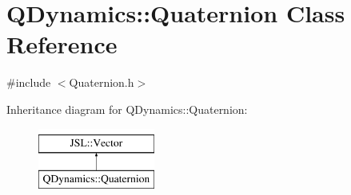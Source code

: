\hypertarget{classQDynamics_1_1Quaternion}{}\section{Q\+Dynamics\+:\+:Quaternion Class Reference}
\label{classQDynamics_1_1Quaternion}


{\ttfamily \#include $<$Quaternion.\+h$>$}

Inheritance diagram for Q\+Dynamics\+:\+:Quaternion\+:\begin{figure}[H]
\begin{center}
\leavevmode
\includegraphics[height=2.000000cm]{classQDynamics_1_1Quaternion}
\end{center}
\end{figure}

